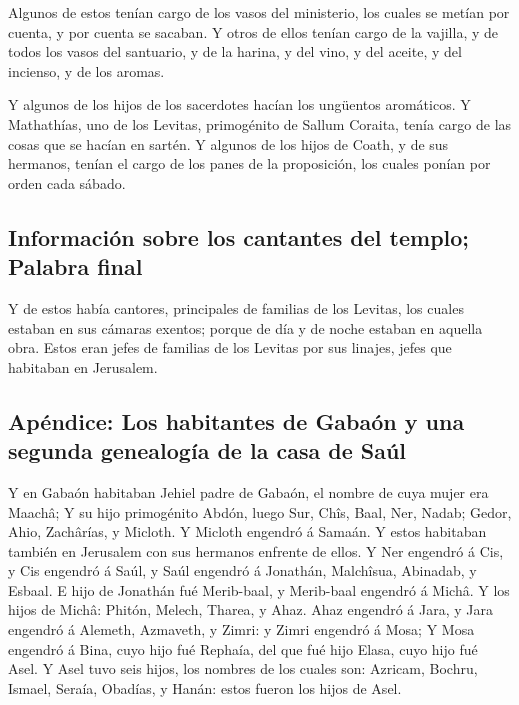  Algunos de estos tenían cargo de los vasos del
ministerio, los cuales se metían por cuenta, y por cuenta se sacaban.
 Y otros de ellos tenían cargo de la vajilla, y de todos
los vasos del santuario, y de la harina, y del vino, y del aceite, y del
incienso, y de los aromas.

 Y algunos de los hijos de los sacerdotes hacían los
ungüentos aromáticos.  Y Mathathías, uno de los Levitas,
primogénito de Sallum Coraita, tenía cargo de las cosas que se hacían en
sartén.  Y algunos de los hijos de Coath, y de sus
hermanos, tenían el cargo de los panes de la proposición, los cuales
ponían por orden cada sábado.

\hypertarget{informaciuxf3n-sobre-los-cantantes-del-templo-palabra-final}{%
\subsection{Información sobre los cantantes del templo; Palabra
final}\label{informaciuxf3n-sobre-los-cantantes-del-templo-palabra-final}}

 Y de estos había cantores, principales de familias de
los Levitas, los cuales estaban en sus cámaras exentos; porque de día y
de noche estaban en aquella obra.  Estos eran jefes de
familias de los Levitas por sus linajes, jefes que habitaban en
Jerusalem.

\hypertarget{apuxe9ndice-los-habitantes-de-gabauxf3n-y-una-segunda-genealoguxeda-de-la-casa-de-sauxfal}{%
\subsection{Apéndice: Los habitantes de Gabaón y una segunda genealogía
de la casa de
Saúl}\label{apuxe9ndice-los-habitantes-de-gabauxf3n-y-una-segunda-genealoguxeda-de-la-casa-de-sauxfal}}

 Y en Gabaón habitaban Jehiel padre de Gabaón, el nombre
de cuya mujer era Maachâ;  Y su hijo primogénito Abdón,
luego Sur, Chîs, Baal, Ner, Nadab;  Gedor, Ahio,
Zachârías, y Micloth.  Y Micloth engendró á Samaán. Y
estos habitaban también en Jerusalem con sus hermanos enfrente de ellos.
 Y Ner engendró á Cis, y Cis engendró á Saúl, y Saúl
engendró á Jonathán, Malchîsua, Abinadab, y Esbaal.  E
hijo de Jonathán fué Merib-baal, y Merib-baal engendró á Michâ.
 Y los hijos de Michâ: Phitón, Melech, Tharea, y Ahaz.
 Ahaz engendró á Jara, y Jara engendró á Alemeth,
Azmaveth, y Zimri: y Zimri engendró á Mosa;  Y Mosa
engendró á Bina, cuyo hijo fué Rephaía, del que fué hijo Elasa, cuyo
hijo fué Asel.  Y Asel tuvo seis hijos, los nombres de
los cuales son: Azricam, Bochru, Ismael, Seraía, Obadías, y Hanán: estos
fueron los hijos de Asel.

